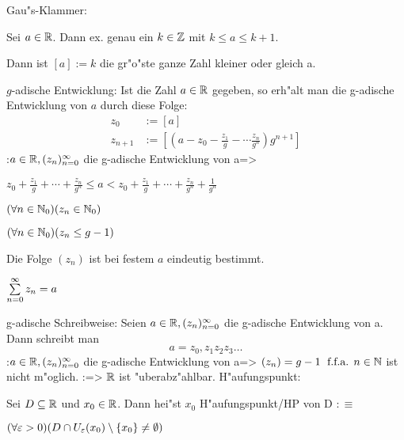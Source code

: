  Gau"s-Klammer:{
  Sei $a\in\mathbb R$. Dann ex. genau ein $k\in\mathbb Z$ mit $k\le a\le k+1$.\par
  Dann ist $[a]:=k$ die gr"o"ste ganze Zahl kleiner oder gleich a.
  }
 $g$-adische Entwicklung:{
  Ist die Zahl $a\in\mathbb R$ gegeben, so erh"alt man die g-adische Entwicklung von
  $a$ durch diese Folge:
  \begin{align*}
    z_0&:=[a]\\
    z_{n+1}&:=\left[\left(a-z_0-\frac{z_1}{g}-\cdots\frac{z_n}{g^n}\right)g^{n+1}\right]
  \end{align*}
  }
\theorem:$a\in\mathbb R, (z_n)_{n=0}^\infty$ die g-adische Entwicklung von a=>{
  \begin{stmts}
    \item $z_0+\frac{z_1}{g}+\cdots+\frac{z_n}{ g^n}\le a <z_0+
          \frac{z_1}{ g}+\cdots+\frac{z_n}{ g^n}+\frac{1}{ g^n}$ 
    \item $(\forall n\in\mathbb N_0)(z_n\in\mathbb N_0)$
    \item $(\forall n\in\mathbb N_0)(z_n\le g-1)$
    \item Die Folge $(z_n)$ ist bei festem $a$ eindeutig bestimmt.
    \item $\sumn 0 z_n=a$
    \end{stmts}
  }
 g-adische Schreibweise:{
  Seien $a\in\mathbb R, (z_n)_{n=0}^\infty$ die g-adische Entwicklung von a. Dann schreibt man
  \[a = z_0,z_1 z_2 z_3\ldots 
    \]
  }
\theorem:$a\in\mathbb R, (z_n)_{n=0}^\infty$ die g-adische Entwicklung von a=>{
  $(z_n)=g-1 \; \text{ f.f.a. } n\in\mathbb N$ ist nicht m"oglich.
  }
\theorem:=>{
  $\mathbb R$ ist "uberabz"ahlbar.
  }
 H"aufungspunkt:{
  Sei $D\subseteq\mathbb R$ und $x_0\in\mathbb R$. Dann hei"st $x_0$
  H"aufungspunkt/HP von D $:\equiv$ \par
  $(\forall \varepsilon>0)(D\cap U_\varepsilon(x_0)\setminus \{x_0\} \ne\emptyset)$
  }
